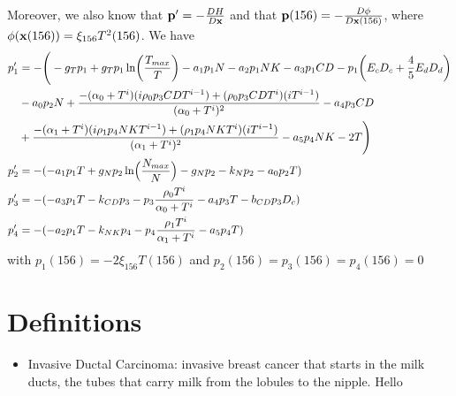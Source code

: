 \documentclass[12pt]{article}
\begin{document}
Moreover, we also know that $\mathbf{p}^\prime = -\frac{DH}{D\mathbf{x}}$ and that $\mathbf{p}(156) =- \frac{D\phi}{D\mathbf{x}(156)}$, where $\phi(\mathbf{x}(156)) = \xi_{156}T^2(156)$.
We have 
\begin{align*}
	p_1^\prime &=-\Biggr(-g_Tp_1+g_T p_1\ln\biggl(\frac{T_{max}}{T} \biggr)-a_1p_1N-a_2 p_1NK-a_3 p_1CD-p_1\biggl(E_cD_c+\frac{4}{5}E_dD_d \biggr)\\
			  &-a_0 p_2  N + \frac{-(\alpha_0+T^i)(i\rho_0 p_3CDT^{i-1})+(\rho_0 p_3CDT^i)(iT^{i-1})}{(\alpha_0+T^i)^2}-a_4 p_3CD \\
			  &+\frac{-(\alpha_1+T^i)(i\rho_1p_4NKT^{i-1})+(\rho_1p_4NKT^i)(iT^{i-1})}{(\alpha_1+T^i)^2}-a_5p_4NK-2T \Biggr) \\
        p_2^\prime &=-(-a_1p_1T+g_Np_2\ln\Bigl(\frac{N_{max}}{N}\Bigr)-g_Np_2 - k_N p_2-a_0p_2T) \\
        p_3^\prime &= -(-a_3 p_1T-k_{CD}p_3-p_3\frac{\rho_0T^i}{\alpha_0+T^i}-a_4 p_3T-b_{CD}p_3D_c) \\
        p_4^\prime &= - (-a_2p_1T-k_{NK}p_4-p_4\frac{\rho_1T^i}{\alpha_1+T^i}-a_5 p_4T)
\end{align*}
with $p_1(156) = -2\xi_{156}T(156)$ and $p_2(156)=p_3(156)=p_4(156)= 0$







\appendix
\section{Definitions}
\begin{itemize}
	\item Invasive Ductal Carcinoma: invasive breast cancer that starts in the milk ducts, the tubes that carry milk from the lobules to the nipple. \cite{TypesDePolo}
Hello
\end{itemize}


\end{document}
